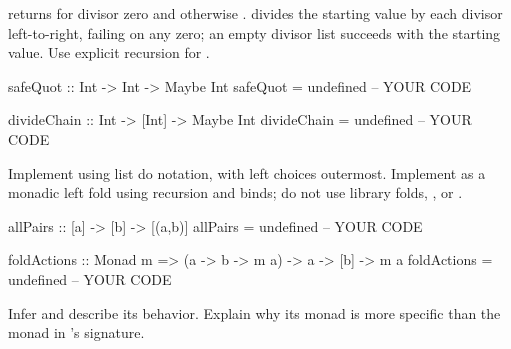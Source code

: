  returns  for divisor zero and otherwise
.  divides the starting value by each
divisor left-to-right, failing on any zero; an empty divisor list succeeds with
the starting value. Use explicit recursion for .
\par\noindent\begin{minipage}{\linewidth}
\begin{codeanswer}
safeQuot :: Int -> Int -> Maybe Int
safeQuot = undefined  -- YOUR CODE

divideChain :: Int -> [Int] -> Maybe Int
divideChain = undefined  -- YOUR CODE
\end{codeanswer}
\end{minipage}\par

Implement  using list do notation, with left choices outermost.
Implement  as a monadic left fold using recursion and binds;
do not use library folds, , or .
\par\noindent\begin{minipage}{\linewidth}
\begin{codeanswer}
allPairs :: [a] -> [b] -> [(a,b)]
allPairs = undefined  -- YOUR CODE

foldActions :: Monad m => (a -> b -> m a) -> a -> [b] -> m a
foldActions = undefined  -- YOUR CODE
\end{codeanswer}
\end{minipage}\par

Infer  and describe its behavior. Explain
why its monad is more specific than the monad in 's signature.
